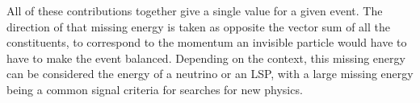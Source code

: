 All of these contributions together give a single \met value for a given event.
The direction of that missing energy is taken as opposite the vector sum of all the constituents, to correspond to the momentum an invisible particle would have to have to make the event balanced.
Depending on the context, this missing energy can be considered the energy of a neutrino or an \ac{LSP}, with a large missing energy being a common signal criteria for searches for new physics.

